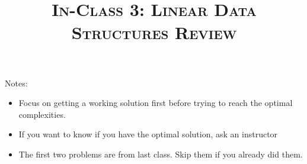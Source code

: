 \documentclass{article}
\title{\large{\textsc{In-Class 3: Linear Data Structures Review}}}
\date{}
\begin{document}
\maketitle
        
\subsection*{}

Notes:

\begin{itemize}
  \item Focus on getting a working solution first before trying to reach the optimal complexities.
  \item If you want to know if you have the optimal solution, ask an instructor
  \item The first two problems are from last class. Skip them if you already did them.
\end{itemize}
    
\subsection*{}
\end{document}
